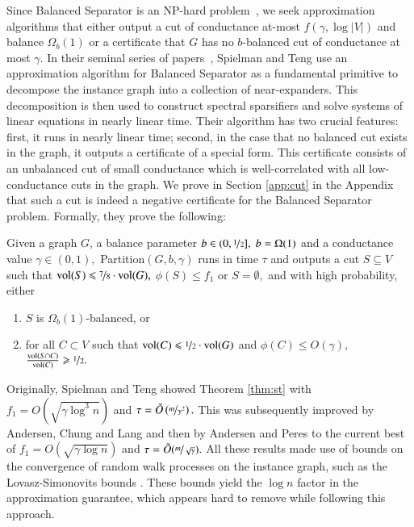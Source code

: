 \documentclass[twoside,leqno,twocolumn]{article}
\newcommand{\nfrac}{\nicefrac}
\renewcommand{\leq}{\leqslant}
\renewcommand{\geq}{\geqslant}
\newcommand{\vol}{\mathrm{vol}}
\newcommand{\BS}{{\sc Balanced Separator}\xspace}
\numberwithin{equation}{section}
\begin{document}
Since {\BS}  is an  NP-hard problem~\cite{GareyJ79}, we seek approximation algorithms that either output a cut of conductance at-most $f(\gamma,\log |V|)$ and balance $
\Omega_b(1)$ or a certificate that $G$ has no $b$-balanced cut of conductance at most $\gamma.$ 
In their seminal series of papers~\cite{ST1, ST2, ST3}, Spielman and Teng use an approximation algorithm for {\BS} as a fundamental primitive to decompose the instance graph into a collection of near-expanders. This decomposition is then used to construct spectral sparsifiers and solve systems of linear equations in nearly linear time. Their algorithm has two crucial features: first, it runs in nearly linear time; second, in the case that no balanced cut exists in the graph, it outputs a certificate of a special form. This certificate consists of an unbalanced cut of small conductance which is well-correlated with all low-conductance cuts in the graph. We prove in Section \ref{app:cut} in the Appendix that such a cut is indeed a negative certificate for the \BS problem.
Formally, they prove the following:
\begin{theorem}\cite{ST1} \label{thm:st}
Given a graph  $G$, a balance parameter $b \in (0,\nfrac{1}{2}], \; b = \Omega(1)$ and a conductance value $\gamma \in (0,1),$ {\sc Partition}$(G,b, \gamma)$ runs in time $\tau$ and outputs a cut $S \subseteq V$ such that $\vol(S) \leq \nfrac{7}{8}\cdot \vol(G),$  $\phi(S) \leq f_{1}$ or $S = \emptyset,$  and with high probability, either
\begin{enumerate}

	\item $S$ is $\Omega_b(1)$-balanced, or 
	\item for all $C \subset V$ such that $\vol(C) \leq \nfrac{1}{2} \cdot  \vol(G)$ and  $\phi(C) \leq O(\gamma),$ 
$
\frac{\vol(S \cap C)}{\vol(C)} \geq \nfrac{1}{2}.
$
\end{enumerate}
\end{theorem}


\noindent
Originally, Spielman and Teng showed Theorem \ref{thm:st} with $f_1= O\left( \sqrt{\gamma \log^3 n}\right)$ and $\tau = \tilde{O}\left(\nfrac{m}{\gamma^2}\right).$ This was subsequently improved by Andersen, Chung and Lang \cite{ACL} and then by Andersen and Peres \cite{AP} to the current best of $f_1=O\left(\sqrt{\gamma \log n}\right)$ and $\tau = \tilde{O}(\nfrac{m}{\sqrt{\gamma}}).$ All these results made use of bounds on the convergence of random walk processes on the instance graph, such as the Lovasz-Simonovits bounds \cite{LS}. These bounds yield the $\log n$ factor in the approximation guarantee, which appears hard to remove while following this approach.
\end{document}

